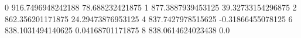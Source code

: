0 916.7496948242188 78.688232421875
1 877.3887939453125 39.32733154296875
2 862.356201171875 24.29473876953125
4 837.7427978515625 -0.31866455078125
6 838.1031494140625 0.04168701171875
8 838.0614624023438 0.0
